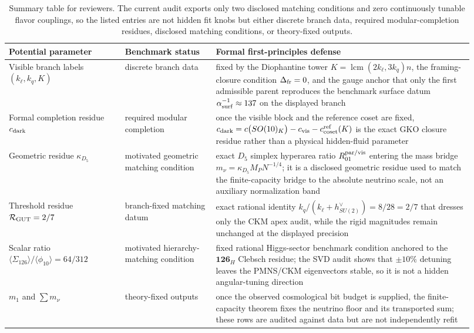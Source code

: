 \documentclass[11pt]{article}
\begin{document}
\begin{table}[t]
\centering
\scriptsize
{\setlength{\tabcolsep}{4pt}
\renewcommand{\arraystretch}{1.14}
\begin{tabular}{@{}>{\raggedright\arraybackslash}p{0.23\linewidth}>{\raggedright\arraybackslash}p{0.18\linewidth}>{\raggedright\arraybackslash}p{0.51\linewidth}@{}}
\hline
Potential parameter & Benchmark status & Formal first-principles defense \\
\hline
Visible branch labels $(k_{\ell},k_q,K)$ & discrete branch data & fixed by the Diophantine tower $K=\operatorname{lcm}(2k_{\ell},3k_q)n$, the framing-closure condition $\Delta_{\rm fr}=0$, and the gauge anchor that only the first admissible parent reproduces the benchmark surface datum $\alpha^{-1}_{\rm surf}\approx137$ on the displayed branch \\
Formal completion residue $c_{\rm dark}$ & required modular completion & once the visible block and the reference coset are fixed, $c_{\rm dark}=c\bigl(SO(10)_K\bigr)-c_{\rm vis}-c_{\rm coset}^{\rm ref}(K)$ is the exact GKO closure residue rather than a physical hidden-fluid parameter \\
Geometric residue $\kappa_{D_5}$ & motivated geometric matching condition & exact $D_5$ simplex hyperarea ratio $R_{01}^{\rm par/vis}$ entering the mass bridge $m_{\nu}=\kappa_{D_5}M_PN^{-1/4}$; it is a disclosed geometric residue used to match the finite-capacity bridge to the absolute neutrino scale, not an auxiliary normalization band \\
Threshold residue $\mathcal R_{\rm GUT}=2/7$ & branch-fixed matching datum & exact rational identity $k_q/(k_{\ell}+h^{\vee}_{SU(2)})=8/28=2/7$ that dresses only the CKM apex audit, while the rigid magnitudes remain unchanged at the displayed precision \\
Scalar ratio $\langle \Sigma_{126} \rangle / \langle \phi_{10} \rangle = 64/312$ & motivated hierarchy-matching condition & fixed rational Higgs-sector benchmark condition anchored to the $\mathbf{126}_H$ Clebsch residue; the SVD audit shows that $\pm10\%$ detuning leaves the PMNS/CKM eigenvectors stable, so it is not a hidden angular-tuning direction \\
$m_1$ and $\sum m_{\nu}$ & theory-fixed outputs & once the observed cosmological bit budget is supplied, the finite-capacity theorem fixes the neutrino floor and its transported sum; these rows are audited against data but are not independently refit \\
\hline
\end{tabular}}
\caption{Summary table for reviewers. The current audit exports only two disclosed matching conditions and zero continuously tunable flavor couplings, so the listed entries are not hidden fit knobs but either discrete branch data, required modular-completion residues, disclosed matching conditions, or theory-fixed outputs.}
\label{tab:s2-reviewer-summary}
\end{table}
\end{document}
